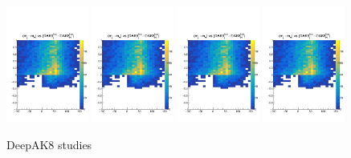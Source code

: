 \documentclass[10pt,oneside]{article}
\begin{document}
\begin{figure}[H]
    \centering
    \includegraphics[page=1,width=0.24\textwidth]{../plots/diff2Dstudy.pdf}
    \includegraphics[page=2,width=0.24\textwidth]{../plots/diff2Dstudy.pdf}
    \includegraphics[page=3,width=0.24\textwidth]{../plots/diff2Dstudy.pdf}
    \includegraphics[page=4,width=0.24\textwidth]{../plots/diff2Dstudy.pdf}
    \caption{DeepAK8 studies}
    \label{figs:DeepAK8_diff_2D}
\end{figure}
\end{document}
